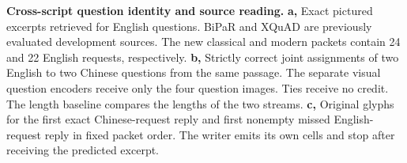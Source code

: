 \textbf{Cross-script question identity and source reading.}
\textbf{a,} Exact pictured excerpts retrieved for English questions. BiPaR and XQuAD are previously evaluated development sources. The new classical and modern packets contain 24 and 22 English requests, respectively.
\textbf{b,} Strictly correct joint assignments of two English to two Chinese questions from the same passage. The separate visual question encoders receive only the four question images. Ties receive no credit. The length baseline compares the lengths of the two streams.
\textbf{c,} Original glyphs for the first exact Chinese-request reply and first nonempty missed English-request reply in fixed packet order. The writer emits its own cells and stop after receiving the predicted excerpt.
